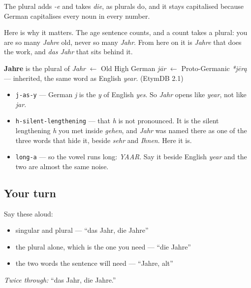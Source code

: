 The plural adds \emph{-e} and takes \emph{die}, as plurals do, and it stays capitalised because German capitalises every noun in every number.

Here is why it matters. The age sentence counts, and a count takes a plural: you are so many \emph{Jahre} old, never so many \emph{Jahr}. From here on it is \emph{Jahre} that does the work, and \emph{das Jahr} that sits behind it.

\begin{cousinweb}
\textbf{Jahre} is the plural of \emph{Jahr} $\leftarrow$ Old High German \emph{jār} $\leftarrow$ Proto-Germanic \emph{*jērą} — inherited, the same word as English \emph{year}. (EtymDB 2.1)
\end{cousinweb}

\begin{sounds}
\begin{itemize}
\raggedright
  \item \texttt{j-as-y} — German \emph{j} is the \emph{y} of English \emph{yes}. So \emph{Jahr} opens like \emph{year}, not like \emph{jar}.
  \item \texttt{h-silent-lengthening} — that \emph{h} is not pronounced. It is the silent lengthening \emph{h} you met inside \emph{gehen}, and \emph{Jahr} was named there as one of the three words that hide it, beside \emph{sehr} and \emph{Ihnen}. Here it is.
  \item \texttt{long-a} — so the vowel runs long: \emph{YAAR}. Say it beside English \emph{year} and the two are almost the same noise.
\end{itemize}
\end{sounds}

\subsection*{Your turn}
Say these aloud:

\begin{itemize}
\raggedright
  \item singular and plural — \textquotedblleft{}das Jahr, die Jahre\textquotedblright{}
  \item the plural alone, which is the one you need — \textquotedblleft{}die Jahre\textquotedblright{}
  \item the two words the sentence will need — \textquotedblleft{}Jahre, alt\textquotedblright{}
\end{itemize}

\emph{Twice through:} \textquotedblleft{}das Jahr, die Jahre.\textquotedblright{}

